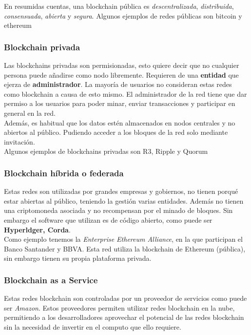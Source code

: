 En resumidas cuentas, una blockchain pública es \emph{descentralizada}, \emph{distribuida}, \emph{consensuada}, \emph{abierta} y \emph{segura}. Algunos ejemplos de redes públicas son bitcoin\cite{webBitcoin} y ethereum\cite{webEthereum}

\subsubsection{Blockchain privada}

Las blockchains privadas son permisionadas, esto quiere decir que no cualquier persona puede añadirse como nodo libremente. Requieren de una \textbf{entidad} que ejerza de \textbf{administrador}. La mayoría de usuarios no consideran estas redes como blockchain a causa de esto mismo. El administrador de la red tiene que dar permiso a los usuarios para poder minar, enviar transacciones y participar en general en la red. \\

Además, es habitual que los datos estén almacenados en nodos centrales y no abiertos al público. Pudiendo acceder a los bloques de la red solo mediante invitación. \\

Algunos ejemplos de blockchains privadas son R3\cite{webR3}, Ripple\cite{webRipple} y Quorum\cite{webQuorum}

\subsubsection{Blockchain híbrida o federada}

Estas redes son utilizadas por grandes empresas y gobiernos, no tienen porqué estar abiertas al público, teniendo la gestión varias entidades. Además no tienen una criptomoneda asociada y no recompensan por el minado de bloques. Sin embargo el software que utilizan es de código abierto, como puede ser \textbf{Hyperldger, Corda}\cite{webHyper, webCorda}. \\

Como ejemplo tenemos la \emph{Enterprise Ethereum Alliance}, en la que participan el Banco Santander y BBVA. Esta red utiliza la blockchain de Ethereum (pública), sin embargo tienen su propia plataforma privada.

\subsubsection{Blockchain as a Service}

Estas redes blockchain son controladas por un proveedor de servicios como puede ser \emph{Amazon}. Estos proveedores permiten utilizar redes blockchain en la nube, permitiendo a los desarrolladores aprovechar el potencial de las redes blockchain sin la necesidad de invertir en el computo que ello requiere.

